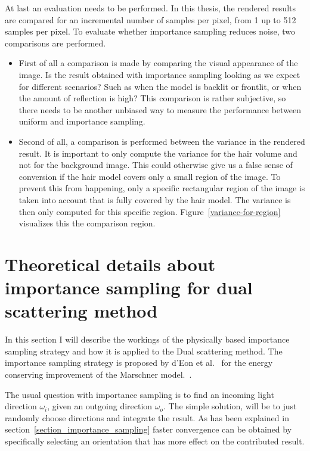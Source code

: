 \documentclass[11pt,a4paper]{report}
\begin{document}
At last an evaluation needs to be performed. In this thesis, the rendered results are compared for an incremental number of samples per pixel, from 1 up to 512 samples per pixel. To evaluate whether importance sampling reduces noise, two comparisons are performed.

\begin{itemize}
    \item First of all a comparison is made by comparing the visual appearance of the image. Is the result obtained with importance sampling looking as we expect for different scenarios? Such as when the model is backlit or frontlit, or when the amount of reflection is high? This comparison is rather subjective, so there needs to be another unbiased way to measure the performance between uniform and importance sampling.
    \item Second of all, a comparison is performed between the variance in the rendered result. It is important to only compute the variance for the hair volume and not for the background image. This could otherwise give us a false sense of conversion if the hair model covers only a small region of the image. To prevent this from happening, only a specific rectangular region of the image is taken into account that is fully covered by the hair model. The variance is then only computed for this specific region. Figure~\ref{variance-for-region} visualizes this the comparison region.
\end{itemize}


\section{Theoretical details about importance sampling for dual scattering method}

In this section I will describe the workings of the physically based importance sampling strategy and how it is applied to the Dual scattering method. The importance sampling strategy is proposed by d'Eon et al.~\cite{eon2013} for the energy conserving improvement of the Marschner model.~\cite{eon2011}.

The usual question with importance sampling is to find an incoming light direction $\omega_i$, given an outgoing direction $\omega_o$. The simple solution, will be to just randomly choose directions and integrate the result. As has been explained in section~\ref{section_importance_sampling} faster convergence can be obtained by specifically selecting an orientation that has more effect on the contributed result.
\end{document}
